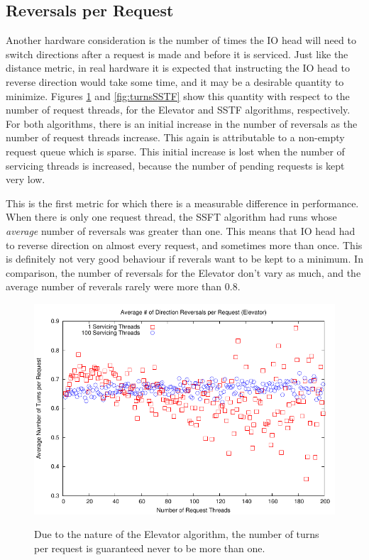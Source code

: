 \documentclass{report}
\begin{document}
\subsection{Reversals per Request}
Another hardware consideration is the number of times the IO head will need to switch
directions after a request is made and before it is serviced. Just like the distance
metric, in real hardware it is expected that instructing the IO head to reverse direction
would take some time, and it may be a desirable quantity to minimize. Figures
\ref{fig:turnsElevator} and \ref{fig:turnsSSTF} show this quantity with respect to the 
number of request threads, for the Elevator and SSTF algorithms, respectively.
For both algorithms, there is an initial increase in the number of reversals as the number
of request threads increase. This again is attributable to a non-empty request queue which
is sparse. This initial increase is lost when the number of servicing threads is
increased, because the number of pending requests is kept very low.

This is the first metric for which there is a measurable difference in performance. When
there is only one request thread, the SSFT algorithm had runs whose \emph{average} number
of reversals was greater than one. This means that IO head had to reverse direction on
almost every request, and sometimes more than once. This is definitely not very good
behaviour if reverals want to be kept to a minimum. In comparison, the number of reversals
for the Elevator don't vary as much, and the average number of reverals rarely were more
than 0.8.
\newpage
\begin{figure}[htb]
    \centering
    \includegraphics[scale=1]{turnsElevator.pdf}
    \label{fig:turnsElevator}
    \caption{Due to the nature of the Elevator algorithm, the number of turns per request
    is guaranteed never to be more than one.}
\end{figure}
\end{document}
